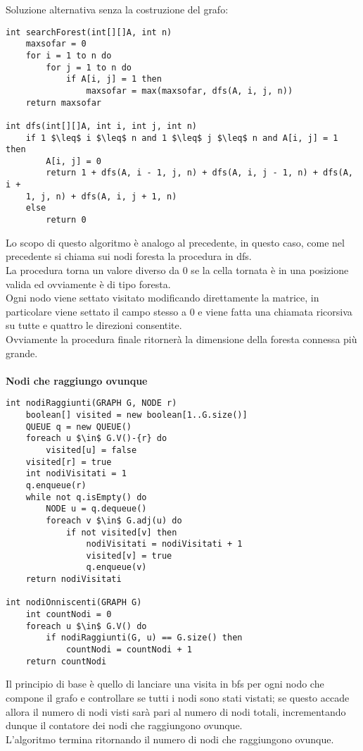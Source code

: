 \documentclass[../cheatSheetAlgoritmi.tex]{subfiles}
\begin{document}
Soluzione alternativa senza la costruzione del grafo:
\begin{lstlisting}[caption=Foresta senza costruzione del grafo]
int searchForest(int[][]A, int n)
	maxsofar = 0
  	for i = 1 to n do
    	for j = 1 to n do
      		if A[i, j] = 1 then
        		maxsofar = max(maxsofar, dfs(A, i, j, n))
  	return maxsofar

int dfs(int[][]A, int i, int j, int n)
	if 1 $\leq$ i $\leq$ n and 1 $\leq$ j $\leq$ n and A[i, j] = 1 then
    	A[i, j] = 0
    	return 1 + dfs(A, i - 1, j, n) + dfs(A, i, j - 1, n) + dfs(A, i +
    1, j, n) + dfs(A, i, j + 1, n)
  	else
    	return 0
\end{lstlisting}
Lo scopo di questo algoritmo è analogo al precedente, in questo caso, come nel precedente si chiama sui nodi foresta la procedura in dfs.\\
La procedura torna un valore diverso da 0 se la cella tornata è in una posizione valida ed ovviamente è di tipo foresta. \\
Ogni nodo viene settato visitato modificando direttamente la matrice, in particolare viene settato il campo stesso a 0 e viene fatta una chiamata ricorsiva su tutte e quattro le direzioni consentite. \\  Ovviamente la procedura finale ritornerà la dimensione della foresta connessa più grande.\\\\
\textbf{Nodi che raggiungo ovunque}\\
\begin{lstlisting}[caption=Nodi che raggiungo ovunque]
int nodiRaggiunti(GRAPH G, NODE r)
	boolean[] visited = new boolean[1..G.size()]
  	QUEUE q = new QUEUE()
  	foreach u $\in$ G.V()-{r} do
    	visited[u] = false
  	visited[r] = true
  	int nodiVisitati = 1
  	q.enqueue(r)
  	while not q.isEmpty() do
    	NODE u = q.dequeue()
    	foreach v $\in$ G.adj(u) do
      		if not visited[v] then
        		nodiVisitati = nodiVisitati + 1
        		visited[v] = true
        		q.enqueue(v)
  	return nodiVisitati

int nodiOnniscenti(GRAPH G)
	int countNodi = 0
  	foreach u $\in$ G.V() do
    	if nodiRaggiunti(G, u) == G.size() then
      		countNodi = countNodi + 1
  	return countNodi
\end{lstlisting}
Il principio di base è quello di lanciare una visita in bfs per ogni nodo che compone il grafo e controllare se tutti i nodi sono stati vistati; se questo accade allora il numero di nodi visti sarà pari al numero di nodi totali, incrementando dunque il contatore dei nodi che raggiungono ovunque. \\ L'algoritmo termina ritornando il numero di nodi che raggiungono ovunque.
\end{document}
